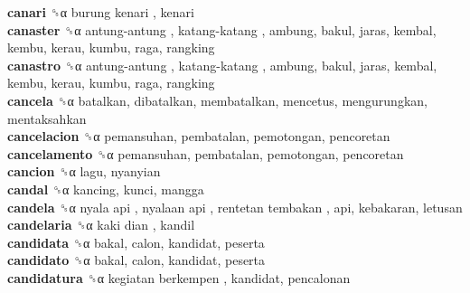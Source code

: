 \textbf{canari} ␝α   burung kenari , kenari  \\
\textbf{canaster} ␝α   antung-antung ,  katang-katang , ambung, bakul, jaras, kembal, kembu, kerau, kumbu, raga, rangking  \\
\textbf{canastro} ␝α   antung-antung ,  katang-katang , ambung, bakul, jaras, kembal, kembu, kerau, kumbu, raga, rangking  \\
\textbf{cancela} ␝α  batalkan, dibatalkan, membatalkan, mencetus, mengurungkan, mentaksahkan  \\
\textbf{cancelacion} ␝α  pemansuhan, pembatalan, pemotongan, pencoretan  \\
\textbf{cancelamento} ␝α  pemansuhan, pembatalan, pemotongan, pencoretan  \\
\textbf{cancion} ␝α  lagu, nyanyian  \\
\textbf{candal} ␝α  kancing, kunci, mangga  \\
\textbf{candela} ␝α   nyala api ,  nyalaan api ,  rentetan tembakan , api, kebakaran, letusan  \\
\textbf{candelaria} ␝α   kaki dian , kandil  \\
\textbf{candidata} ␝α  bakal, calon, kandidat, peserta  \\
\textbf{candidato} ␝α  bakal, calon, kandidat, peserta  \\
\textbf{candidatura} ␝α   kegiatan berkempen , kandidat, pencalonan  \\
